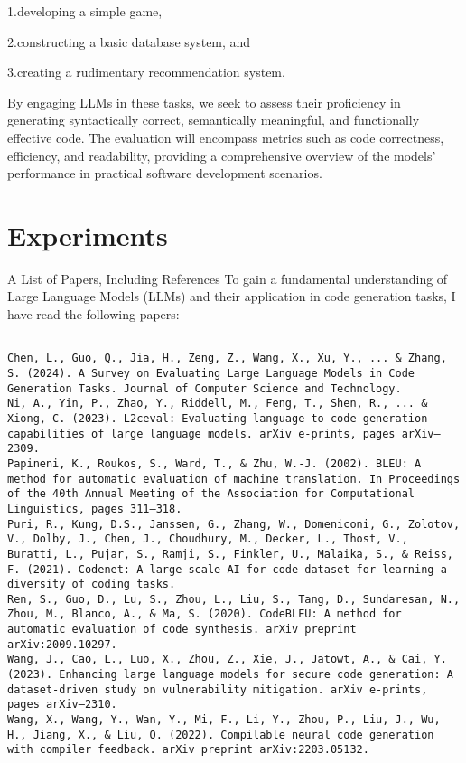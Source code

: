 \documentclass[11pt]{article}
\begin{document}
1.developing a simple game, 

2.constructing a basic database system, and 

3.creating a rudimentary recommendation system. 

By engaging LLMs in these tasks, we seek to assess their proficiency in generating syntactically correct, semantically meaningful, and functionally effective code. The evaluation will encompass metrics such as code correctness, efficiency, and readability, providing a comprehensive overview of the models' performance in practical software development scenarios.

\section{Experiments}

A List of Papers, Including References
To gain a fundamental understanding of Large Language Models (LLMs) and their application in code generation tasks, I have read the following papers:


\begin{verbatim}

Chen, L., Guo, Q., Jia, H., Zeng, Z., Wang, X., Xu, Y., ... & Zhang, S. (2024). A Survey on Evaluating Large Language Models in Code Generation Tasks. Journal of Computer Science and Technology.
Ni, A., Yin, P., Zhao, Y., Riddell, M., Feng, T., Shen, R., ... & Xiong, C. (2023). L2ceval: Evaluating language-to-code generation capabilities of large language models. arXiv e-prints, pages arXiv–2309.
Papineni, K., Roukos, S., Ward, T., & Zhu, W.-J. (2002). BLEU: A method for automatic evaluation of machine translation. In Proceedings of the 40th Annual Meeting of the Association for Computational Linguistics, pages 311–318.
Puri, R., Kung, D.S., Janssen, G., Zhang, W., Domeniconi, G., Zolotov, V., Dolby, J., Chen, J., Choudhury, M., Decker, L., Thost, V., Buratti, L., Pujar, S., Ramji, S., Finkler, U., Malaika, S., & Reiss, F. (2021). Codenet: A large-scale AI for code dataset for learning a diversity of coding tasks.
Ren, S., Guo, D., Lu, S., Zhou, L., Liu, S., Tang, D., Sundaresan, N., Zhou, M., Blanco, A., & Ma, S. (2020). CodeBLEU: A method for automatic evaluation of code synthesis. arXiv preprint arXiv:2009.10297.
Wang, J., Cao, L., Luo, X., Zhou, Z., Xie, J., Jatowt, A., & Cai, Y. (2023). Enhancing large language models for secure code generation: A dataset-driven study on vulnerability mitigation. arXiv e-prints, pages arXiv–2310.
Wang, X., Wang, Y., Wan, Y., Mi, F., Li, Y., Zhou, P., Liu, J., Wu, H., Jiang, X., & Liu, Q. (2022). Compilable neural code generation with compiler feedback. arXiv preprint arXiv:2203.05132.

\end{verbatim}
\end{document}
